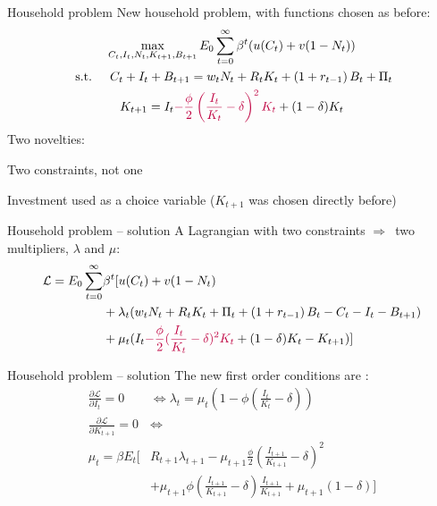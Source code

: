 \documentclass{beamer}
\newcommand{\tms}[1]{{\color{mint}{#1}}}
\newenvironment{mynumerate}
{\vfill\enumerate[nolistsep,itemsep=\fill,label=\arabic*.]}
  {\endenumerate}
\newcommand{\rarr}{$\Rightarrow$\ }
\begin{document}
\begin{frame}{Household problem}
  New household problem, with functions chosen as before:
  $$
\begin{gathered}
\max_{C_{t}, I_{t}, N_{t}, K_{t+1}, B_{t+1}} E_{0} \sum_{t=0}^{\infty} \beta^{t}(u(C_t) + v(1-N_t)) \\
\text { s.t. } \quad
C_{t}+I_{t}+B_{t+1} =  w_{t} N_{t}+R_{t} K_{t}+\left(1+r_{t-1}\right) B_{t} +\Pi_{t}\\
K_{t+1}=I_{t}\textcolor{purple}{-\frac{\phi}{2}\left(\frac{I_{t}}{K_{t}}-\delta\right)^{2} K_{t}}+(1-\delta) K_{t}
\end{gathered}
$$
Two novelties:
\begin{mynumerate}
\item Two constraints, not one
\item Investment used as a choice variable ($K_{t+1}$ was chosen directly before)
\end{mynumerate}
\end{frame}

\begin{frame}{Household problem -- solution}
A Lagrangian with two constraints \rarr two multipliers, $\lambda$ and $\mu$:
\begin{align*}
\mathcal{L}=E_{0} \sum_{t=0}^{\infty} &\beta^{t}[u(C_t) + v(1-N_t) \\
&+\lambda_{t}(w_{t} N_{t}+R_{t} K_{t}+\Pi_{t}+\left(1+r_{t-1}\right) B_{t}-C_{t}-I_{t}-B_{t+1}) \\
&+\mu_{t}(I_{t}\textcolor{purple}{-\frac{\phi}{2}(\frac{I_{t}}{K_{t}}-\delta)^{2} K_{t}}+(1-\delta) K_{t}-K_{t+1})]
\end{align*}
\end{frame}

\begin{frame}{Household problem -- solution}
The new first order conditions are \tms{(obtain them yourself for training)}:
\begin{align*}
\frac{\partial \mathcal{L}}{\partial I_{t}}=0 &\Leftrightarrow \lambda_{t}=\mu_{t}(1-\phi(\frac{I_{t}}{K_{t}}-\delta)) \\
\frac{\partial \mathcal{L}}{\partial K_{t+1}}=0 &\Leftrightarrow  \\ \mu_{t}=\beta E_{t}[&R_{t+1} \lambda_{t+1}-\mu_{t+1} \frac{\phi}{2}(\frac{I_{t+1}}{K_{t+1}}-\delta)^{2} \\
&+\mu_{t+1} \phi(\frac{I_{t+1}}{K_{t+1}}-\delta) \frac{I_{t+1}}{K_{t+1}}+\mu_{t+1}(1-\delta)] 
\end{align*}

\end{frame}
\end{document}
